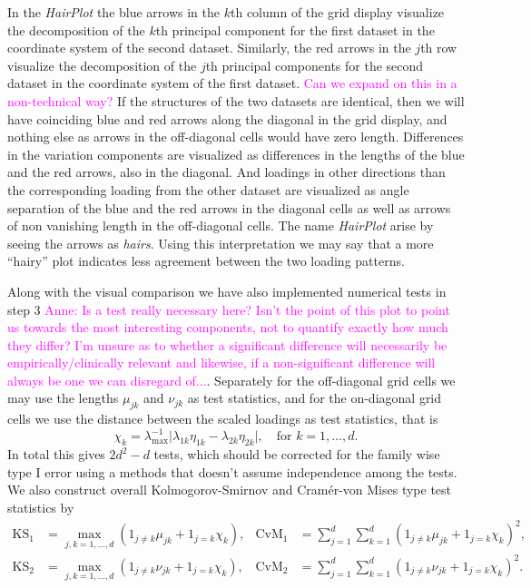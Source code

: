 \documentclass[titlepage,11pt,twoside]{article}
\newcommand{\hl}[1]{\textcolor{magenta}{#1}}
\begin{document}
In the \emph{HairPlot} the blue arrows in the $k$th column of the grid display visualize the decomposition of the $k$th principal component for the first dataset in the coordinate system of the second dataset. Similarly, the red arrows in the $j$th row visualize the decomposition of the $j$th principal components for the second dataset in the coordinate system of the first dataset. \hl{Can we expand on this in a non-technical way?} If the structures of the two datasets are identical, then we will have coinciding blue and red arrows along the diagonal in the grid display, and nothing else as arrows in the off-diagonal cells would have zero length. Differences in the variation components are visualized as differences in the lengths of the blue and the red arrows, also in the diagonal. And loadings in other directions than the corresponding loading from the other dataset are visualized as angle separation of the blue and the red arrows in the diagonal cells as well as arrows of non vanishing length in the off-diagonal cells. The name \emph{HairPlot} arise by seeing the arrows as \emph{hairs}. Using this interpretation we may say that a more ``hairy'' plot indicates less agreement between the two loading patterns.

Along with the visual comparison we have also implemented numerical tests in step 3 \hl{Anne: Is a test really necessary here? Isn't the point of this plot to point us towards the most interesting components, not to quantify exactly how much they differ? I'm unsure as to whether a significant difference will necessarily be empirically/clinically relevant and likewise, if a non-significant difference will always be one we can disregard of...}. Separately for the off-diagonal grid cells we may use the lengths $\mu_{jk}$ and $\nu_{jk}$ as test statistics, and for the on-diagonal grid cells we use the distance between the scaled loadings as test statistics, that is
\begin{equation*}
\chi_k = \lambda_{\max}^{-1} \lvert \lambda_{1k} \eta_{1k} - \lambda_{2k} \eta_{2k} \rvert, \quad \text{for $k=1,\dotsc,d$.}
\end{equation*}
In total this gives $2d^2 - d$ tests, which should be corrected for the family wise type I error using a methods that doesn't assume independence among the tests. We also construct overall Kolmogorov-Smirnov and Cram\'er-von Mises type test statistics by
\begin{align*}
\text{KS}_1 &= \max_{j,k=1,\dotsc,d} (1_{j \neq k} \mu_{jk} + 1_{j=k} \chi_k), &
\text{CvM}_1 &= \sum_{j=1}^d \sum_{k=1}^d (1_{j \neq k} \mu_{jk} + 1_{j=k} \chi_k)^2, \\
\text{KS}_2 &= \max_{j,k=1,\dotsc,d} (1_{j \neq k} \nu_{jk} + 1_{j=k} \chi_k), &
\text{CvM}_2 &= \sum_{j=1}^d \sum_{k=1}^d (1_{j \neq k} \nu_{jk} + 1_{j=k} \chi_k)^2.
\end{align*}
\end{document}
